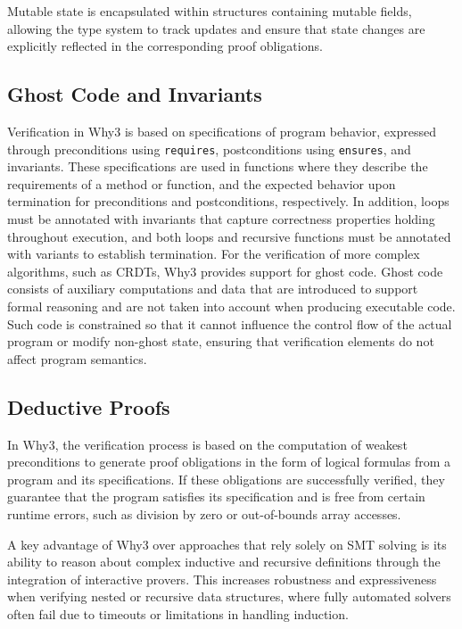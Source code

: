 Mutable state is encapsulated within structures containing mutable fields, allowing the type system to track updates and ensure that state changes are explicitly reflected in the corresponding proof obligations.

\subsection{Ghost Code and Invariants}
\label{sub:ghost}

Verification in Why3 is based on specifications of program behavior, expressed through preconditions using \texttt{requires}, postconditions using \texttt{ensures}, and invariants. These specifications are used in functions where they describe the requirements of a method or function, and the expected behavior upon termination for preconditions and postconditions, respectively. In addition, loops must be annotated with invariants that capture correctness properties holding throughout execution, and both loops and recursive functions must be annotated with variants to establish termination. For the verification of more complex algorithms, such as CRDTs, Why3 provides support for ghost code. Ghost code consists of auxiliary computations and data that are introduced to support formal reasoning and are not taken into account when producing executable code. Such code is constrained so that it cannot influence the control flow of the actual program or modify non-ghost state, ensuring that verification elements do not affect program semantics.

\subsection{Deductive Proofs}
\label{sub:deductive_proofs}

In Why3, the verification process is based on the computation of weakest preconditions to generate proof obligations in the form of logical formulas from a program and its specifications. If these obligations are successfully verified, they guarantee that the program satisfies its specification and is free from certain runtime errors, such as division by zero or out-of-bounds array accesses.

A key advantage of Why3 over approaches that rely solely on SMT solving is its ability to reason about complex inductive and recursive definitions through the integration of interactive provers. This increases robustness and expressiveness when verifying nested or recursive data structures, where fully automated solvers often fail due to timeouts or limitations in handling induction.
